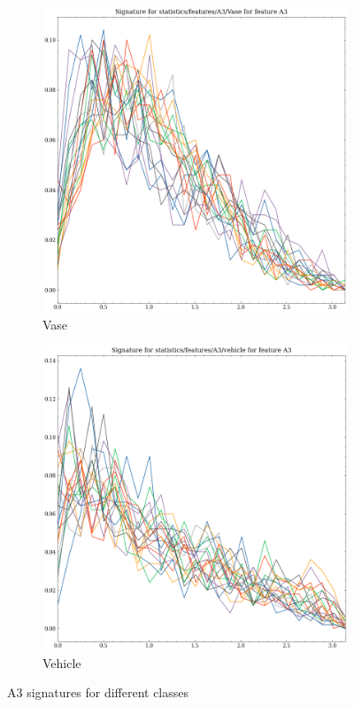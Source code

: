\begin{figure}[ht]
    \begin{subfigure}[b]{0.23\textwidth}
        \includegraphics[width=\textwidth]{assets/feature_extraction/A3/Vase.png}
        \caption{Vase}
        \label{fig:features-statistics-A3-y}    
    \end{subfigure}
    \hfill
    \begin{subfigure}[b]{0.23\textwidth}
        \includegraphics[width=\textwidth]{assets/feature_extraction/A3/vehicle.png}
        \caption{Vehicle}
        \label{fig:features-statistics-A3-z}    
    \end{subfigure}
    \hfill
    
    \caption{A3 signatures for different classes}
    \label{fig:A3-signatures-2}
\end{figure}


